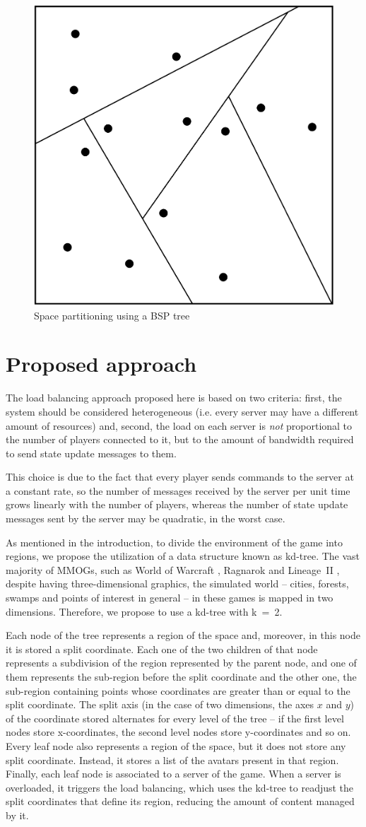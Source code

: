\documentclass[acmjacm]{acmtrans2m}
\begin{document}
\begin{figure}[!t]
	\centering
	\includegraphics[width=0.3\linewidth]{images/bsp}
	\caption{Space partitioning using a BSP tree}
	\label{fig:bsp}
\end{figure}

\section{Proposed approach}
\label{sec:proposal}

The load balancing approach proposed here is based on two criteria: first, the system should be considered heterogeneous (i.e. every server may have a different amount of resources) and, second, the load on each server is \emph{not} proportional to the number of players connected to it, but to the amount of bandwidth required to send state update messages to them.

This choice is due to the fact that every player sends commands to the server at a constant rate, so the number of messages received by the server per unit time grows linearly with the number of players, whereas the number of state update messages sent by the server may be quadratic, in the worst case.

As mentioned in the introduction, to divide the environment of the game into regions, we propose the utilization of a data structure known as kd-tree. The vast majority of MMOGs, such as World of Warcraft \cite{worldofwarcraft}, Ragnarok \cite{ragnarok} and \mbox{Lineage II} \cite{lineage2}, despite having three-dimensional graphics, the simulated world -- cities, forests, swamps and points of interest in general -- in these games is mapped in two dimensions. Therefore, we propose to use a kd-tree with \mbox{k = 2}.

Each node of the tree represents a region of the space and, moreover, in this node it is stored a split coordinate. Each one of the two children of that node represents a subdivision of the region represented by the parent node, and one of them represents the sub-region before the split coordinate and the other one, the sub-region containing points whose coordinates are greater than or equal to the split coordinate. The split axis (in the case of two dimensions, the axes $x$ and $y$) of the coordinate stored alternates for every level of the tree -- if the first level nodes store x-coordinates, the second level nodes store y-coordinates and so on. Every leaf node also represents a region of the space, but it does not store any split coordinate. Instead, it stores a list of the avatars present in that region. Finally, each leaf node is associated to a server of the game. When a server is overloaded, it triggers the load balancing, which uses the kd-tree to readjust the split coordinates that define its region, reducing the amount of content managed by it.
\end{document}
